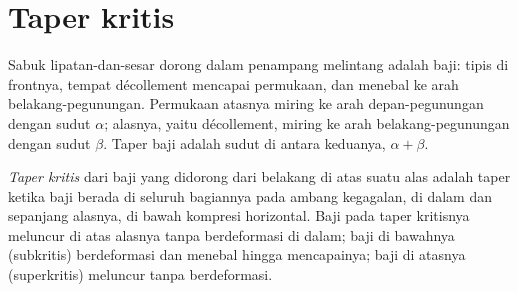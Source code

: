 \begin{omfigure}
\par{}\label{fig:b3:orogenic-wedges:duplex}
\end{omfigure}


\section{Taper kritis}\label{sec:b3:orogenic-wedges:taper}

Sabuk lipatan-dan-sesar dorong dalam penampang melintang adalah baji: tipis di frontnya, tempat
décollement mencapai permukaan, dan menebal ke arah belakang-pegunungan.
Permukaan atasnya miring ke arah depan-pegunungan dengan sudut $\alpha$; alasnya,
yaitu décollement, miring ke arah belakang-pegunungan dengan sudut $\beta$. Taper
baji adalah sudut di antara keduanya, $\alpha + \beta$.

\begin{definition}\label{def:b3:orogenic-wedges:critical-taper}
\emph{Taper kritis} dari baji yang didorong dari belakang
di atas suatu alas adalah taper ketika baji berada di seluruh bagiannya pada ambang
kegagalan, di dalam dan sepanjang alasnya, di bawah kompresi horizontal. Baji pada
taper kritisnya meluncur di atas alasnya tanpa berdeformasi di dalam; baji
di bawahnya (subkritis) berdeformasi dan menebal hingga mencapainya; baji
di atasnya (superkritis) meluncur tanpa berdeformasi.
\end{definition}

